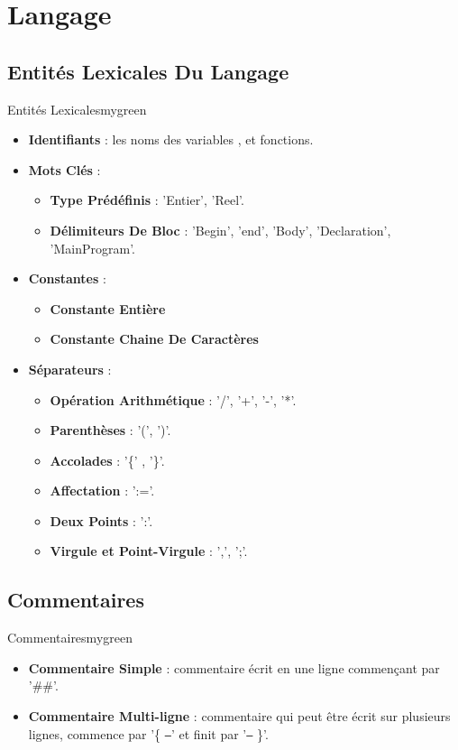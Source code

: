 \newpage

\section{Langage}
\subsection{Entités Lexicales Du Langage}
\begin{prettyBox}{Entités Lexicales}{mygreen}
\begin{itemize}
    \item \textbf{Identifiants} : les noms des variables , et fonctions.
    \item \textbf{Mots Clés} :
        \begin{itemize}
            \item \textbf{Type Prédéfinis} : 'Entier', 'Reel'.
            \item \textbf{Délimiteurs De Bloc} : 'Begin', 'end', 'Body', 'Declaration', 'MainProgram'.
        \end{itemize}
    \item \textbf{Constantes} :
         \begin{itemize}
             \item \textbf{Constante Entière}
             \item \textbf{Constante Chaine De Caractères}
         \end{itemize}
    \item \textbf{Séparateurs} :
        \begin{itemize}
            \item \textbf{Opération Arithmétique} : '/', '+', '-', '*'.
            \item \textbf{Parenthèses} : '(', ')'.
            \item \textbf{Accolades} : '\{' , '\}'.
            \item \textbf{Affectation} : ':='.
            \item \textbf{Deux Points} : ':'.
            \item \textbf{Virgule et Point-Virgule} : ',', ';'.
        \end{itemize}
\end{itemize}
\end{prettyBox}

\vspace{1cm}

\subsection{Commentaires}
\begin{prettyBox}{Commentaires}{mygreen}
    \begin{itemize}
        \item \textbf{Commentaire Simple} : commentaire écrit en 
            une ligne commençant par '\#\#'.
        \item \textbf{Commentaire Multi-ligne} : commentaire qui peut
            être écrit sur plusieurs lignes, commence par '\{ \texttt{--}' et finit par '\texttt{--} \}'.
    \end{itemize}
\end{prettyBox}



